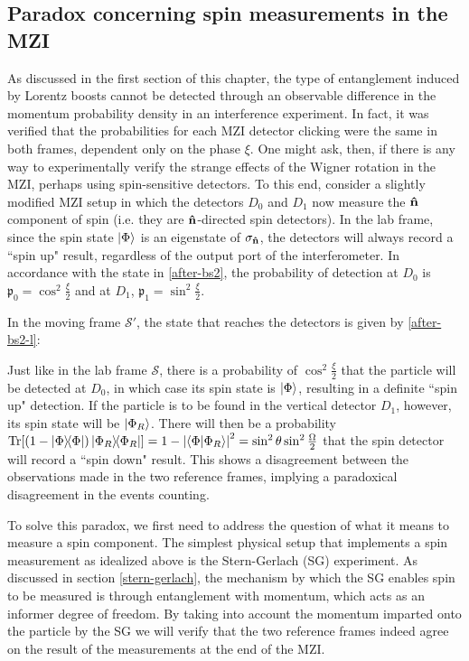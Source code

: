 \documentclass[12pt,a4paper,notitlepage]{report}
\begin{document}
\subsection{Paradox concerning spin measurements in the MZI}

As discussed in the first section of this chapter, the type of entanglement induced by Lorentz boosts cannot be detected through an observable difference in the momentum probability density in an interference experiment. In fact, it was verified that the probabilities for each MZI detector clicking were the same in both frames, dependent only on the phase $\xi$. One might ask, then, if there is any way to experimentally verify the strange effects of the Wigner rotation in the MZI, perhaps using spin-sensitive detectors. To this end, consider a slightly modified MZI setup in which the detectors $D_0$ and $D_1$ now measure the $\vu{n}$ component of spin (i.e. they are $\vu{n}$-directed spin detectors). In the lab frame, since the spin state $\ket{\Phi}$ is an eigenstate of $\sigma_{\vu{n}}$, the detectors will always record a ``spin up" result, regardless of the output port of the interferometer. In accordance with the state in \eqref{after-bs2}, the probability of detection at $D_0$ is $\mathfrak{p}_0 = \cos^2\frac{\xi}{2}$ and at $D_1$, $\mathfrak{p}_1 = \sin^2\frac{\xi}{2}$.

In the moving frame $\mathcal{S}'$, the state that reaches the detectors is given by \eqref{after-bs2-l}:

%
Just like in the lab frame $\mathcal{S}$, there is a probability of $\cos^2\frac{\xi}{2}$ that the particle will be detected at $D_0$, in which case its spin state is $\ket{\Phi}$, resulting in a definite ``spin up" detection. If the particle is to be found in the vertical detector $D_1$, however, its spin state will be $\ket{\Phi_R}$. There will then be a probability $\Tr[(1-\dyad{\Phi})\dyad{\Phi_R}] = 1-\left|\bra{\Phi}\ket{\Phi_R}\right|^2 = \sin^2\theta\sin^2\frac{\Omega}{2}$ that the spin detector will record a ``spin down" result. This shows a disagreement between the observations made in the two reference frames, implying a paradoxical disagreement in the events counting.

To solve this paradox, we first need to address the question of what it means to measure a spin component. The simplest physical setup that implements a spin measurement as idealized above is the Stern-Gerlach (SG) experiment. As discussed in section \ref{stern-gerlach}, the mechanism by which the SG enables spin to be measured is through entanglement with momentum, which acts as an informer degree of freedom. By taking into account the momentum imparted onto the particle by the SG we will verify that the two reference frames indeed agree on the result of the measurements at the end of the MZI.
\end{document}
